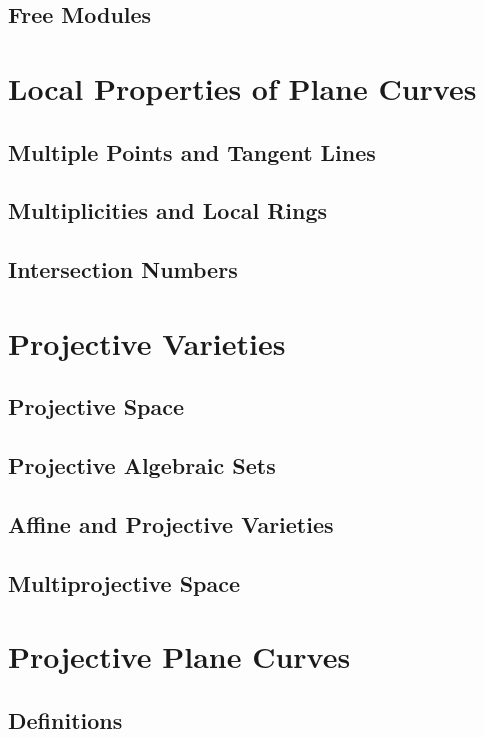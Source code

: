 \documentclass[oneside]{amsbook}
\numberwithin{prob}{chapter}
\begin{document}
\section{Free Modules}


\chapter{Local Properties of Plane Curves}
\section{Multiple Points and Tangent Lines}

\section{Multiplicities and Local Rings}

\section{Intersection Numbers}


\chapter{Projective Varieties}
\section{Projective Space}

\section{Projective Algebraic Sets}

\section{Affine and Projective Varieties}

\section{Multiprojective Space}


\chapter{Projective Plane Curves}
\section{Definitions}

\end{document}

